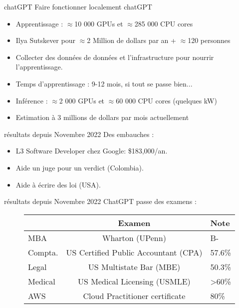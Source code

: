 \begin{frame}{chatGPT}
  Faire fonctionner localement chatGPT
  \begin{itemize}
    \item Apprentissage : $\approx$10 000 GPUs et $\approx$285 000 CPU cores
    \item Ilya Sutskever pour $\approx$2 Million de dollars par an + $\approx$120 personnes
    \item Collecter des données de données et l'infrastructure pour nourrir l'apprentissage.
    \item Temps d'apprentissage : 9-12 mois, si tout se passe bien...
    \item Inférence : $\approx$2 000 GPUs et $\approx$60 000 CPU cores (quelques kW)
    \item Estimation à 3 millions de dollars par mois actuellement
  \end{itemize}
\end{frame}

\begin{frame}{résultats depuis Novembre 2022}
  Des embauches :
  \begin{itemize}
    \item L3 Software Developer chez Google: \$183,000/an.
    \item Aide un juge pour un verdict (Colombia).
    \item Aide à écrire des loi (USA).
  \end{itemize}
\end{frame}

\begin{frame}{résultats depuis Novembre 2022}
  ChatGPT passe des examens :
  \begin{figure}
    \centering
    \begin{tabular}{lcl}
      \toprule
              & Examen                               & Note  \\
      \midrule
      MBA     & Wharton (UPenn)                       & B-  \\
      Compta. & US Certified Public Accountant (CPA)  & 57.6\% \\
      Legal   & US Multistate Bar (MBE)               & 50.3\% \\
      Medical & US Medical Licensing (USMLE)          & >60\% \\
      AWS     & Cloud Practitioner certificate        & 80\% \\
      \bottomrule
    \end{tabular}
  \end{figure}

\end{frame}

